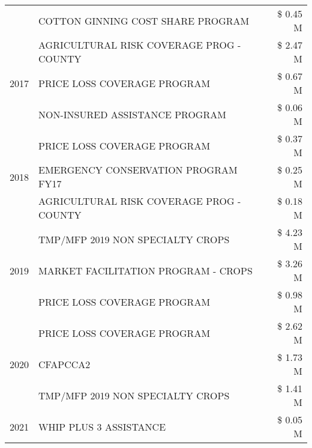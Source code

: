 \begin{tabular}{llr}
 & COTTON GINNING COST SHARE PROGRAM & \$ 0.45 M \\
\cline{1-3}
\multirow[t]{3}{*}{2017} & AGRICULTURAL RISK COVERAGE PROG - COUNTY & \$ 2.47 M \\
 & PRICE LOSS COVERAGE PROGRAM & \$ 0.67 M \\
 & NON-INSURED ASSISTANCE PROGRAM & \$ 0.06 M \\
\cline{1-3}
\multirow[t]{3}{*}{2018} & PRICE LOSS COVERAGE PROGRAM & \$ 0.37 M \\
 & EMERGENCY CONSERVATION PROGRAM FY17 & \$ 0.25 M \\
 & AGRICULTURAL RISK COVERAGE PROG - COUNTY & \$ 0.18 M \\
\cline{1-3}
\multirow[t]{3}{*}{2019} & TMP/MFP 2019 NON SPECIALTY CROPS & \$ 4.23 M \\
 & MARKET FACILITATION PROGRAM - CROPS & \$ 3.26 M \\
 & PRICE LOSS COVERAGE PROGRAM & \$ 0.98 M \\
\cline{1-3}
\multirow[t]{3}{*}{2020} & PRICE LOSS COVERAGE PROGRAM & \$ 2.62 M \\
 & CFAPCCA2 & \$ 1.73 M \\
 & TMP/MFP 2019 NON SPECIALTY CROPS & \$ 1.41 M \\
\cline{1-3}
2021 & WHIP PLUS 3 ASSISTANCE & \$ 0.05 M \\
\cline{1-3}
\bottomrule
\end{tabular}
